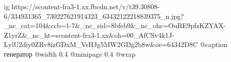  
 
 
 
 

\ifcmt
  ig https://scontent-fra3-1.xx.fbcdn.net/v/t39.30808-6/334931365_730227621914323_63432122218839375_n.jpg?_nc_cat=104&ccb=1-7&_nc_sid=8bfeb9&_nc_ohc=OuRE9pfzKZYAX-Z1yrZ&_nc_ht=scontent-fra3-1.xx&oh=00_AfCSv4k1J-LylU2diy0ZRv8izGDxM_VrHJg5MW2GDg2b8w&oe=64342D8C
	@caption генератор
  @width 0.4
  @minipage 0.4
  @wrap \parpic[l]
\fi
